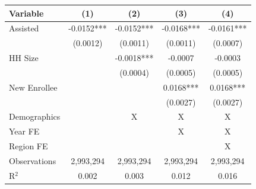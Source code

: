 
\begin{tabular}{lcccc}
\toprule
Variable & (1) & (2) & (3) & (4)\\
\midrule
Assisted & -0.0152*** & -0.0152*** & -0.0168*** & -0.0161***\\
 & (0.0012) & (0.0011) & (0.0011) & (0.0007)\\
HH Size &  & -0.0018*** & -0.0007 & -0.0003\\
 &  & (0.0004) & (0.0005) & (0.0005)\\
New Enrollee &  &  & 0.0168*** & 0.0168***\\
 &  &  & (0.0027) & (0.0027)\\
Demographics &  & X & X & X\\
Year FE &  &  & X & X\\
Region FE &  &  &  & X\\
Observations & 2,993,294 & 2,993,294 & 2,993,294 & 2,993,294\\
R$^2$ & 0.002 & 0.003 & 0.012 & 0.016\\
\bottomrule
\end{tabular}
